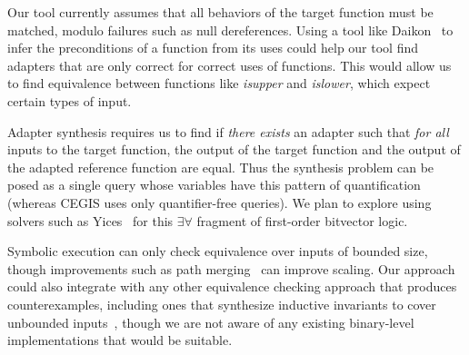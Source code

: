 Our tool currently assumes that all behaviors of the target function must be matched, modulo failures such as null dereferences.
%
Using a tool like Daikon~\cite{ernst2007daikon} to infer the preconditions of a function from its uses could help our tool find adapters that are only correct for correct uses of functions.
%
This would allow us to find equivalence between functions like {\em isupper} and {\em islower}, which expect certain types of input.

Adapter synthesis requires us to find if {\em there exists} an adapter such that {\em for all} inputs to the target function, the output of the target function and the output of the adapted reference function are equal. 
%
Thus the synthesis problem can be posed as a single query whose variables have this pattern of quantification (whereas CEGIS uses only quantifier-free queries).
%
We plan to explore using solvers such as Yices~\cite{yices} for this $\exists\forall$ fragment of first-order bitvector logic.

Symbolic execution can only check equivalence over inputs of bounded
size, though improvements such as path
merging~\cite{KuznetsovKBC2012,AvgerinosRCB2014} can improve scaling.
%
Our approach could also integrate with any other equivalence checking
approach that produces counterexamples, including ones that
synthesize inductive invariants to cover unbounded
inputs~\cite{SrivastavaG2009}, though we are not aware of any
existing binary-level implementations that would be suitable.
